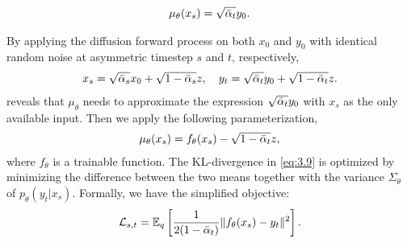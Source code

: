 {\begin{theorem}
%
\begin{align}
\mu_{\theta}(x_s) = \sqrt{\bar{\alpha}_{t}}y_0\textcolor{black}{.}
\end{align}
\end{theorem}
%
By applying the diffusion forward process on both $x_0$ and $y_0$ with identical random noise at asymmetric timestep $s$ and $t$, respectively, 
%
\begin{align}
x_s=\sqrt{\bar{\alpha}_{s}}x_0+\sqrt{1-\bar{\alpha}_{s}}z,\quad y_t=\sqrt{\bar{\alpha}_{t}}y_0+\sqrt{1-\bar{\alpha}_{t}}z.
\end{align}
%
 reveals that $\mu_{\theta}$ needs to approximate the expression $\sqrt{\bar{\alpha}_{t}}y_0$ with $x_s$ as the only available input. Then we apply the following parameterization,
%
\begin{align}\label{eq:3.10}
\mu_{\theta}(x_s)=f_{\theta}(x_s)-\sqrt{1-\bar{\alpha}_{t}}z,
\end{align}
%
where $f_{\theta}$ is a trainable function.
%
The KL-divergence in \cref{eq:3.9} is optimized by minimizing the difference between the two means together with the variance $\Sigma_{\theta}$ of $p_{\theta}(y_t|x_s)$.
%
Formally, we have the simplified objective:
%
\begin{align}
\mathcal L_{s,t}=\mathbb E_q\left[\frac{1}{2(1-\bar{\alpha}_{t})}\|f_{\theta}(x_s)-y_t\|^2\right].
\end{align}
}



